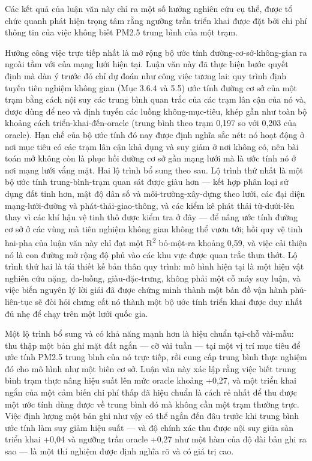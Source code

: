 Các kết quả của luận văn này chỉ ra một số hướng nghiên cứu cụ thể, được tổ chức quanh phát hiện trọng tâm rằng ngưỡng trần triển khai được đặt bởi chi phí thông tin của việc không biết PM2.5 trung bình của một trạm.

Hướng công việc trực tiếp nhất là mở rộng bộ ước tính đường-cơ-sở-không-gian ra ngoài tầm với của mạng lưới hiện tại. Luận văn này đã thực hiện bước quyết định mà dàn ý trước đó chỉ dự đoán như công việc tương lai: quy trình định tuyến tiên nghiệm không gian (Mục 3.6.4 và 5.5) ước tính đường cơ sở của một trạm bằng cách nội suy các trung bình quan trắc của các trạm lân cận của nó và, được dùng để neo và định tuyến các luồng không-mục-tiêu, khép gần như toàn bộ khoảng cách triển-khai-đến-oracle (trung bình theo trạm 0,197 so với 0,203 của oracle). Hạn chế của bộ ước tính đó nay được định nghĩa sắc nét: nó hoạt động ở nơi mục tiêu có các trạm lân cận khả dụng và suy giảm ở nơi không có, nên bài toán mở không còn là phục hồi đường cơ sở gần mạng lưới mà là ước tính nó ở nơi mạng lưới vắng mặt. Hai lộ trình bổ sung theo sau. Lộ trình thứ nhất là một bộ ước tính trung-bình-trạm quan sát được giàu hơn --- kết hợp phân loại sử dụng đất tinh hơn, mật độ dân số và môi-trường-xây-dựng theo lưới, các đại diện mạng-lưới-đường và phát-thải-giao-thông, và các kiểm kê phát thải từ-dưới-lên thay vì các khí hậu vệ tinh thô được kiểm tra ở đây --- để nâng ước tính đường cơ sở ở các vùng mà tiên nghiệm không gian không thể vươn tới; hồi quy vệ tinh hai-pha của luận văn này chỉ đạt một R\textsuperscript{2} bỏ-một-ra khoảng 0,59, và việc cải thiện nó là con đường mở rộng độ phủ vào các khu vực được quan trắc thưa thớt. Lộ trình thứ hai là tái thiết kế bản thân quy trình: mô hình hiện tại là một hiện vật nghiên cứu nặng, đa-luồng, giàu-đặc-trưng, không phải một cỗ máy suy luận, và việc biến nguyên lý lời giải đã được chứng minh thành một bản đồ vận hành phủ-liên-tục sẽ đòi hỏi chưng cất nó thành một bộ ước tính triển khai được duy nhất đủ nhẹ để chạy trên một lưới quốc gia.

Một lộ trình bổ sung và có khả năng mạnh hơn là hiệu chuẩn tại-chỗ vài-mẫu: thu thập một bản ghi mặt đất ngắn --- cỡ vài tuần --- tại một vị trí mục tiêu để ước tính PM2.5 trung bình của nó trực tiếp, rồi cung cấp trung bình thực nghiệm đó cho mô hình như một biên cơ sở. Luận văn này xác lập rằng việc biết trung bình trạm thực nâng hiệu suất lên mức oracle khoảng +0,27, và một triển khai ngắn của một cảm biến chi phí thấp đã hiệu chuẩn là cách rẻ nhất để thu được một ước tính dùng được về trung bình đó mà không cần một trạm thường trực. Việc định lượng một bản ghi như vậy có thể ngắn đến đâu trước khi trung bình ước tính làm suy giảm hiệu suất --- và độ chính xác thu được nội suy giữa sàn triển khai +0,04 và ngưỡng trần oracle +0,27 như một hàm của độ dài bản ghi ra sao --- là một thí nghiệm được định nghĩa rõ và có giá trị cao.

